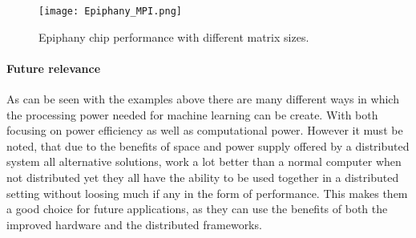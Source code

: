 \begin{figure}
  \texttt{[image: Epiphany\_MPI.png]}
  \caption{Epiphany chip performance with different matrix sizes\cite{Rich15}.}
  \label{Epiphany_MPI}
\end{figure}

\paragraph{Future relevance}
As can be seen with the examples above there are many different ways in which the
processing power needed for machine learning can be create. With both focusing
on power efficiency as well as computational power. However it must be noted,
that due to the benefits of space and power supply offered by a distributed system
all alternative solutions, work a lot better than a normal computer when not distributed
yet they all have the ability to be used together in a distributed setting without
loosing much if any in the form of performance. This makes them a good choice for
future applications, as they can use the benefits of both the improved hardware
and the distributed frameworks.
